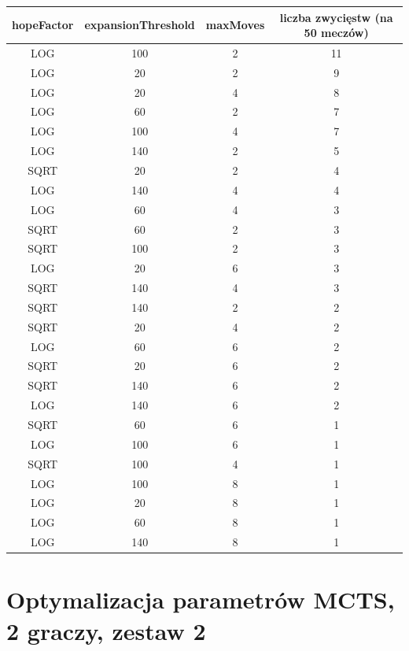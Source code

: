 \documentclass{pracamgr}
\begin{document}
\begin{appendices}
\begin{center}
    \begin{tabular}{| c | c | c | c |}
	\hline
    hopeFactor & expansionThreshold & maxMoves & liczba zwycięstw (na 50 meczów) \\ \hline
	\hline
        LOG & 100 & 2 & 11 \\ \hline
        LOG & 20 & 2 & 9 \\ \hline
        LOG & 20 & 4 & 8 \\ \hline
        LOG & 60 & 2 & 7 \\ \hline
        LOG & 100 & 4 & 7 \\ \hline
        LOG & 140 & 2 & 5 \\ \hline
        SQRT & 20 & 2 & 4 \\ \hline
        LOG & 140 & 4 & 4 \\ \hline
        LOG & 60 & 4 & 3 \\ \hline
        SQRT & 60 & 2 & 3 \\ \hline
        SQRT & 100 & 2 & 3 \\ \hline
        LOG & 20 & 6 & 3 \\ \hline
        SQRT & 140 & 4 & 3 \\ \hline
        SQRT & 140 & 2 & 2 \\ \hline
        SQRT & 20 & 4 & 2 \\ \hline
        LOG & 60 & 6 & 2 \\ \hline
        SQRT & 20 & 6 & 2 \\ \hline
        SQRT & 140 & 6 & 2 \\ \hline
        LOG & 140 & 6 & 2 \\ \hline
        SQRT & 60 & 6 & 1 \\ \hline
        LOG & 100 & 6 & 1 \\ \hline
        SQRT & 100 & 4 & 1 \\ \hline
        LOG & 100 & 8 & 1 \\ \hline
        LOG & 20 & 8 & 1 \\ \hline
        LOG & 60 & 8 & 1 \\ \hline
        LOG & 140 & 8 & 1 \\ \hline
    \end{tabular}
\end{center}

\vfill
\hspace{0pt}
\pagebreak

\section{Optymalizacja parametrów MCTS, 2 graczy, zestaw 2\label{results-2-2p}}


\end{appendices}
\end{document}
